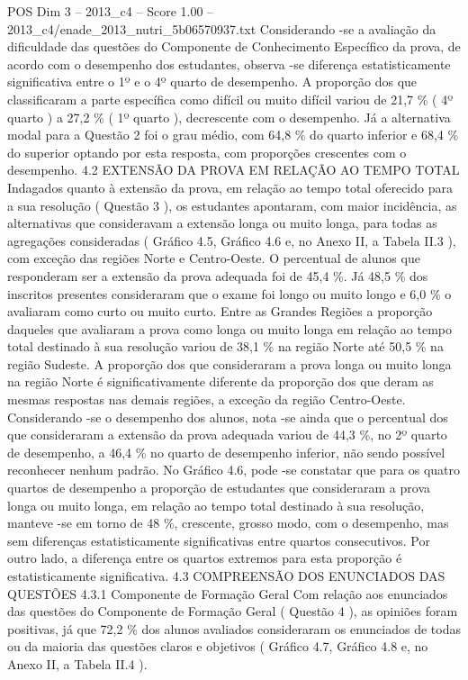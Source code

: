 \begin{textsample}{POS Dim 3 – 2013\_c4 – Score 1.00 – 2013\_c4/enade\_2013\_nutri\_5b06570937.txt}
Considerando -se a avaliação da dificuldade das questões do Componente de Conhecimento Específico da prova, de acordo com o desempenho dos estudantes, observa -se diferença estatisticamente significativa entre o 1º e o 4º quarto de desempenho.
A proporção dos que classificaram a parte específica como difícil ou muito difícil variou de 21,7 \% ( 4º quarto ) a 27,2 \% ( 1º quarto ), decrescente com o desempenho.
Já a alternativa modal para a Questão 2 foi o grau médio, com 64,8 \% do quarto inferior e 68,4 \% do superior optando por esta resposta, com proporções crescentes com o desempenho. 4.2 EXTENSÃO DA PROVA EM RELAÇÃO AO TEMPO TOTAL Indagados quanto à extensão da prova, em relação ao tempo total oferecido para a sua resolução ( Questão 3 ), os estudantes apontaram, com maior incidência, as alternativas que consideravam a extensão longa ou muito longa, para todas as agregações consideradas ( Gráfico 4.5, Gráfico 4.6 e, no Anexo II, a Tabela II.3 ), com exceção das regiões Norte e Centro-Oeste.
O percentual de alunos que responderam ser a extensão da prova adequada foi de 45,4 \%.
Já 48,5 \% dos inscritos presentes consideraram que o exame foi longo ou muito longo e 6,0 \% o avaliaram como curto ou muito curto.
Entre as Grandes Regiões a proporção daqueles que avaliaram a prova como longa ou muito longa em relação ao tempo total destinado à sua resolução variou de 38,1 \% na região Norte até 50,5 \% na região Sudeste.
A proporção dos que consideraram a prova longa ou muito longa na região Norte é significativamente diferente da proporção dos que deram as mesmas respostas nas demais regiões, a exceção da região Centro-Oeste.
Considerando -se o desempenho dos alunos, nota -se ainda que o percentual dos que consideraram a extensão da prova adequada variou de 44,3 \%, no 2º quarto de desempenho, a 46,4 \% no quarto de desempenho inferior, não sendo possível reconhecer nenhum padrão.
No Gráfico 4.6, pode -se constatar que para os quatro quartos de desempenho a proporção de estudantes que consideraram a prova longa ou muito longa, em relação ao tempo total destinado à sua resolução, manteve -se em torno de 48 \%, crescente, grosso modo, com o desempenho, mas sem diferenças estatisticamente significativas entre quartos consecutivos.
Por outro lado, a diferença entre os quartos extremos para esta proporção é estatisticamente significativa. 4.3 COMPREENSÃO DOS ENUNCIADOS DAS QUESTÕES 4.3.1 Componente de Formação Geral Com relação aos enunciados das questões do Componente de Formação Geral ( Questão 4 ), as opiniões foram positivas, já que 72,2 \% dos alunos avaliados consideraram os enunciados de todas ou da maioria das questões claros e objetivos ( Gráfico 4.7, Gráfico 4.8 e, no Anexo II, a Tabela II.4 ).

\end{textsample}
